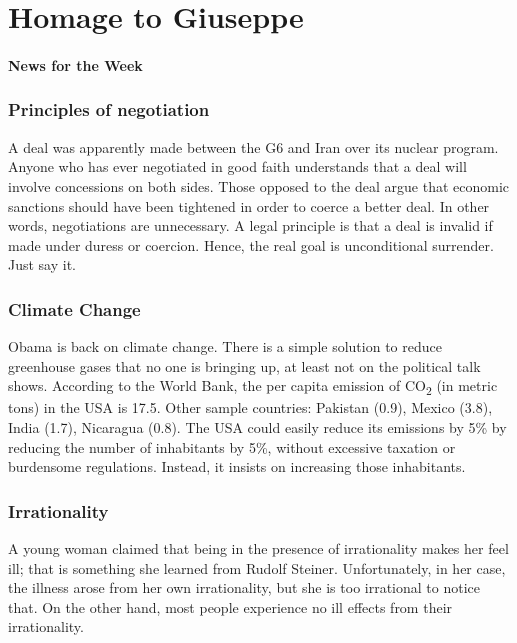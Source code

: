 \section{Homage to Giuseppe}

\paragraph{News for the Week}


\subsubsection{Principles of negotiation}

A deal was apparently made between the G6 and Iran over its nuclear program. Anyone who has ever negotiated in good faith understands that a deal will involve concessions on both sides. Those opposed to the deal argue that economic sanctions should have been tightened in order to coerce a better deal. In other words, negotiations are unnecessary. A legal principle is that a deal is invalid if made under duress or coercion. Hence, the real goal is unconditional surrender. Just say it.

\subsubsection{Climate Change}


Obama is back on climate change. There is a simple solution to reduce greenhouse gases that no one is bringing up, at least not on the political talk shows. According to the {World Bank}, the per capita emission of CO\textsubscript{2} (in metric tons) in the USA is 17.5. Other sample countries: Pakistan (0.9), Mexico (3.8), India (1.7), Nicaragua (0.8). The USA could easily reduce its emissions by 5\% by reducing the number of inhabitants by 5\%, without excessive taxation or burdensome regulations. Instead, it insists on increasing those inhabitants.

\subsubsection{Irrationality}


A young woman claimed that being in the presence of irrationality makes her feel ill; that is something she learned from Rudolf Steiner. Unfortunately, in her case, the illness arose from her own irrationality, but she is too irrational to notice that. On the other hand, most people experience no ill effects from their irrationality.

